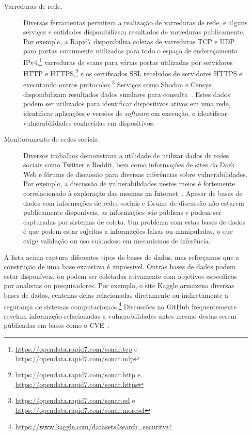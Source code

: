 \begin{description}
  \item[Varreduras de rede.] Diversas ferramentas permitem a realização de varreduras de rede, e alguns serviços e entidades disponibilizam resultados de varreduras publicamente. Por exemplo, a Rapid7 disponibiliza coletas de varreduras TCP e UDP para portas comumente utilizadas para todo o espaço de endereçamento IPv4,\footnote{\url{https://opendata.rapid7.com/sonar.tcp} e \url{https://opendata.rapid7.com/sonar.udp}} varreduras de scans para várias portas utilizadas por servidores HTTP e HTTPS,\footnote{\url{https://opendata.rapid7.com/sonar.http} e \url{https://opendata.rapid7.com/sonar.https}} e os certificados SSL recebidos de servidores HTTPS e executando outros protocolos.\footnote{\url{https://opendata.rapid7.com/sonar.ssl} e \url{https://opendata.rapid7.com/sonar.moressl}} Serviços como Shodan e Censys disponibilizam resultados dados similares para consulta~\cite{bada2020shodan, durumeric2015search}. Estes dados podem ser utilizados para identificar dispositivos ativos em uma rede, identificar aplicações e versões de \emph{software} em execução, e identificar vulnerabilidades conhecidas em dispositivos.

  \item[Monitoramento de redes sociais.] Diversos trabalhos demonstram a utilidade de utilizar dados de redes sociais como Twitter e Reddit, bem como informações de sites da Dark Web e fórums de discussão para diversas inferências sobre vulnerabilidades. Por exemplo, a discussão de vulnerabilidades nestes meios é fortemente correlacionado à exploração das mesmas na Internet~\cite{almukaynizi2017security, almukaynizi2019patch}. Apesar de bases de dados com informações de redes sociais e fórums de discussão não estarem publicamente disponíveis, as informações \emph{são} públicas e podem ser capturadas por sistemas de coleta. Um problema com estas bases de dados é que podem estar sujeitas a informações falsas ou manipuladas, o que exige validação ou uso cuidadoso em mecanismos de inferência.

\end{description}

A lista acima captura diferentes tipos de bases de dados, mas reforçamos que a construção de uma base exaustiva é impossível. Outras bases de dados podem estar disponíveis, ou podem ser coletadas ativamente com objetivos específicos por analistas ou pesquisadores. Por exemplo, o site Kaggle armazena diversas bases de dados, centenas delas relacionadas diretamente ou indiretamente a segurança de sistemas computacionais.\footnote{\url{https://www.kaggle.com/datasets?search=security}} Discussões no GitHub frequentemente revelam informação relacionadas a vulnerabilidades antes mesmo destas serem públicadas em bases como o CVE~\cite{le22github}.

